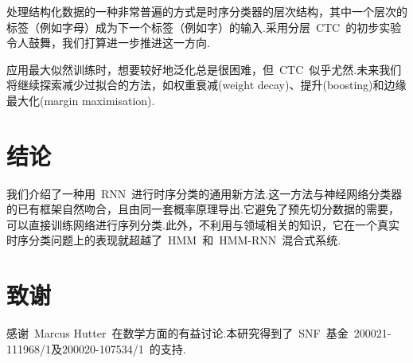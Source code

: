 \documentclass{ctexart}
\begin{document}
处理结构化数据的一种非常普遍的方式是时序分类器的层次结构，其中一个层次的标签（例如字母）成为下一个标签（例如字）的输入.采用分层~CTC~的初步实验令人鼓舞，我们打算进一步推进这一方向.

应用最大似然训练时，想要较好地泛化总是很困难，但~CTC~似乎尤然.未来我们将继续探索减少过拟合的方法，如权重衰减(weight decay)、提升(boosting)和边缘最大化(margin maximisation).
\section{结论}
\label{sec:conclusion}
我们介绍了一种用~RNN~进行时序分类的通用新方法.这一方法与神经网络分类器的已有框架自然吻合，且由同一套概率原理导出.它避免了预先切分数据的需要，可以直接训练网络进行序列分类.此外，不利用与领域相关的知识，它在一个真实时序分类问题上的表现就超越了~HMM~和~HMM-RNN~混合式系统.

\section*{致谢}
感谢~Marcus Hutter~在数学方面的有益讨论.本研究得到了~SNF~基金~200021-111968/1及200020-107534/1~的支持.



\end{document}
